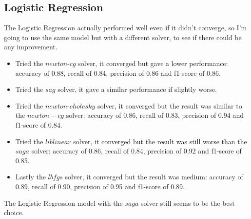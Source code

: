 \documentclass{article}
\begin{document}
\begin{titlepage}
  \section{Logistic Regression}
  The Logistic Regression actually performed well even if it didn't converge, so I'm going to use the same model but with a different solver, to see if there could be any improvement.

  \begin{itemize}
    \item Tried the $newton$-$cg$ solver, it converged but gave a lower performance: accuracy of 0.88, recall of 0.84, precision of 0.86 and f1-score of 0.86.
    \item Tried the $sag$ solver, it gave a similar performance if slightly worse.
    \item Tried the $newton$-$cholesky$ solver, it converged but the result was similar to the $newton-cg$ solver: accuracy of 0.86, recall of 0.83, precision of 0.94 and f1-score of 0.84.
    \item Tried the $liblinear$ solver, it converged but the result was still worse than the $saga$ solver: accuracy of 0.86, recall of 0.84, precision of 0.92 and f1-score of 0.85.
    \item Lastly the $lbfgs$ solver, it converged but the result was medium: accuracy of 0.89, recall of 0.90, precision of 0.95 and f1-score of 0.89.
  \end{itemize}

  The Logistic Regression model with the $saga$ solver still seems to be the best choice.


\end{titlepage}
\end{document}
